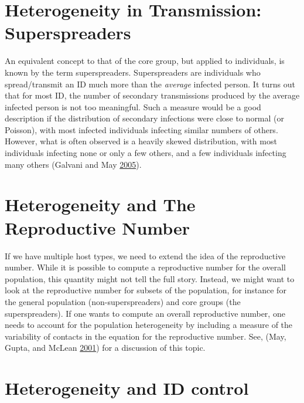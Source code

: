 \documentclass[
]{book}
\begin{document}
\hypertarget{heterogeneity-in-transmission-superspreaders}{%
\section{Heterogeneity in Transmission: Superspreaders}\label{heterogeneity-in-transmission-superspreaders}}

An equivalent concept to that of the core group, but applied to individuals, is known by the term superspreaders. Superspreaders are individuals who spread/transmit an ID much more than the \emph{average} infected person. It turns out that for most ID, the number of secondary transmissions produced by the average infected person is not too meaningful. Such a measure would be a good description if the distribution of secondary infections were close to normal (or Poisson), with most infected individuals infecting similar numbers of others. However, what is often observed is a heavily skewed distribution, with most individuals infecting none or only a few others, and a few individuals infecting many others (Galvani and May \protect\hyperlink{ref-galvani05}{2005}).

\hypertarget{heterogeneity-and-the-reproductive-number}{%
\section{Heterogeneity and The Reproductive Number}\label{heterogeneity-and-the-reproductive-number}}

If we have multiple host types, we need to extend the idea of the reproductive number. While it is possible to compute a reproductive number for the overall population, this quantity might not tell the full story. Instead, we might want to look at the reproductive number for subsets of the population, for instance for the general population (non-superspreaders) and core groups (the superspreaders). If one wants to compute an overall reproductive number, one needs to account for the population heterogeneity by including a measure of the variability of contacts in the equation for the reproductive number. See, (May, Gupta, and McLean \protect\hyperlink{ref-may01}{2001}) for a discussion of this topic.

\hypertarget{heterogeneity-and-id-control}{%
\section{Heterogeneity and ID control}\label{heterogeneity-and-id-control}}
\end{document}
